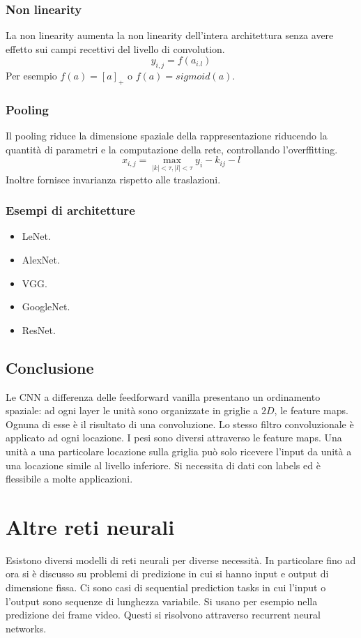 		\subsubsection{Non linearity}
		La non linearity aumenta la non linearity dell'intera architettura senza avere effetto sui campi recettivi del livello di convolution.
		$$y_{i,j} = f(a_{i.l})$$
		Per esempio $f(a) = [a]_+$ o $f(a) = sigmoid(a)$.
		
		\subsubsection{Pooling}
		Il pooling riduce la dimensione spaziale della rappresentazione riducendo la quantit\`a di parametri e la computazione della rete, controllando l'overffitting.
		$$x_{i,j} = \max\limits_{|k|<\tau, |l|<\tau}y_i - k_{ij} - l$$
		Inoltre fornisce invarianza rispetto alle traslazioni.
		
		\subsubsection{Esempi di architetture}
		\begin{multicols}{2}
			\begin{itemize}
				\item LeNet.
				\item AlexNet.
				\item VGG.
				\item GoogleNet.
				\item ResNet.
			\end{itemize}
		\end{multicols}

	\subsection{Conclusione}
	Le CNN a differenza delle feedforward vanilla presentano un ordinamento spaziale: ad ogni layer le unit\`a sono organizzate in griglie a $2D$, le feature maps.
	Ognuna di esse \`e il risultato di una convoluzione.
	Lo stesso filtro convoluzionale \`e applicato ad ogni locazione.
	I pesi sono diversi attraverso le feature maps.
	Una unit\`a a una particolare locazione sulla griglia pu\`o solo ricevere l'input da unit\`a a una locazione simile al livello inferiore.
	Si necessita di dati con labels ed \`e flessibile a molte applicazioni.

\section{Altre reti neurali}
Esistono diversi modelli di reti neurali per diverse necessit\`a.
In particolare fino ad ora si \`e discusso su problemi di predizione in cui si hanno input e output di dimensione fissa.
Ci sono casi di sequential prediction tasks in cui l'input o l'output sono sequenze di lunghezza variabile.
Si usano per esempio nella predizione dei frame video. 
Questi si risolvono attraverso recurrent neural networks.

